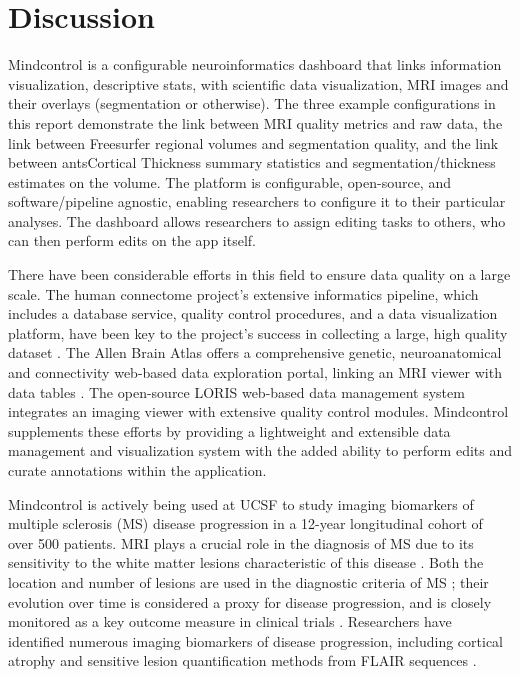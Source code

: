 \section{Discussion}

Mindcontrol is a configurable neuroinformatics dashboard that links information visualization, descriptive stats, with scientific data visualization, MRI images and their overlays (segmentation or otherwise). The three example configurations in this report demonstrate the link between MRI quality metrics and raw data, the link between Freesurfer regional volumes and segmentation quality, and the link between antsCortical Thickness summary statistics and segmentation/thickness estimates on the volume. The platform is configurable, open-source, and software/pipeline agnostic, enabling researchers to configure it to their particular analyses. The dashboard allows researchers to assign editing tasks to others, who can then perform edits on the app itself. 

There have been considerable efforts in this field to ensure data quality on a large scale. The human connectome project's extensive informatics pipeline, which includes a database service, quality control procedures, and a data visualization platform, have been key to the project's success in collecting a large, high quality dataset \cite{Marcus_2013}. The Allen Brain Atlas offers a comprehensive genetic, neuroanatomical and connectivity web-based data exploration portal, linking an MRI viewer with data tables \cite{Sunkin_2012}. The open-source LORIS web-based data management system integrates an imaging viewer with extensive quality control modules\cite{Das_2012}. Mindcontrol supplements these efforts by providing a lightweight and extensible data management and visualization system with the added ability to perform edits and curate annotations within the application. 

Mindcontrol is actively being used at UCSF to study imaging biomarkers of multiple sclerosis (MS) disease progression in a 12-year longitudinal cohort of over 500 patients. MRI plays a crucial role in the diagnosis of MS due to its sensitivity to the white matter lesions characteristic of this disease \cite{ge2006multiple}.  Both the location and number of lesions are used in the diagnostic criteria of MS \cite{mcdonald2001recommended}; their evolution over time is considered a proxy for disease progression, and is closely monitored as a key outcome measure in clinical trials \cite{ge2000glatiramer}. Researchers have identified numerous imaging biomarkers of disease progression, including cortical atrophy \cite{fisher2008gray} and sensitive lesion quantification methods from FLAIR sequences \cite{Schmidt_2012}. 

